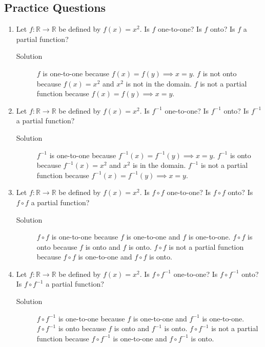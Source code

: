 \documentclass[11pt]{article}
\begin{document}
\subsection{Practice Questions}
\label{sec:orgb01b947}
\begin{enumerate}
\item Let \(f: \mathbb{R} \rightarrow \mathbb{R}\) be defined by \(f(x) = x^2\). Is \(f\) one-to-one? Is \(f\) onto? Is \(f\) a partial function?
\begin{description}
\item[{Solution}] \(f\) is one-to-one because \(f(x) = f(y) \implies x = y\). \(f\) is not onto because \(f(x) = x^2\) and \(x^2\) is not in the domain. \(f\) is not a partial function because \(f(x) = f(y) \implies x = y\).
\end{description}
\item Let \(f: \mathbb{R} \rightarrow \mathbb{R}\) be defined by \(f(x) = x^2\). Is \(f^{-1}\) one-to-one? Is \(f^{-1}\) onto? Is \(f^{-1}\) a partial function?
\begin{description}
\item[{Solution}] \(f^{-1}\) is one-to-one because \(f^{-1}(x) = f^{-1}(y) \implies x = y\). \(f^{-1}\) is onto because \(f^{-1}(x) = x^2\) and \(x^2\) is in the domain. \(f^{-1}\) is not a partial function because \(f^{-1}(x) = f^{-1}(y) \implies x = y\).
\end{description}
\item Let \(f: \mathbb{R} \rightarrow \mathbb{R}\) be defined by \(f(x) = x^2\). Is \(f \circ f\) one-to-one? Is \(f \circ f\) onto? Is \(f \circ f\) a partial function?
\begin{description}
\item[{Solution}] \(f \circ f\) is one-to-one because \(f\) is one-to-one and \(f\) is one-to-one. \(f \circ f\) is onto because \(f\) is onto and \(f\) is onto. \(f \circ f\) is not a partial function because \(f \circ f\) is one-to-one and \(f \circ f\) is onto.
\end{description}
\item Let \(f: \mathbb{R} \rightarrow \mathbb{R}\) be defined by \(f(x) = x^2\). Is \(f \circ f^{-1}\) one-to-one? Is \(f \circ f^{-1}\) onto? Is \(f \circ f^{-1}\) a partial function?
\begin{description}
\item[{Solution}] \(f \circ f^{-1}\) is one-to-one because \(f\) is one-to-one and \(f^{-1}\) is one-to-one. \(f \circ f^{-1}\) is onto because \(f\) is onto and \(f^{-1}\) is onto. \(f \circ f^{-1}\) is not a partial function because \(f \circ f^{-1}\) is one-to-one and \(f \circ f^{-1}\) is onto.
\end{description}
\end{enumerate}
\end{document}
